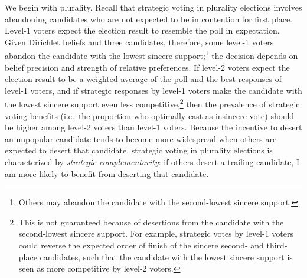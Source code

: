 \documentclass[11pt,a4paper]{article}
\begin{document}
We begin with plurality. Recall that  strategic voting in plurality elections involves abandoning candidates who are not expected to be in contention for first place. Level-1 voters expect the election result to resemble the poll in expectation. Given Dirichlet beliefs and three candidates, therefore, some level-1 voters abandon the candidate with the lowest sincere support;\footnote{Others may abandon the candidate with the second-lowest sincere support.} the decision depends on belief precision and strength of relative preferences. If level-2 voters expect the election result to be a weighted average of the poll and the best responses of level-1 voters, and if strategic responses by level-1 voters make the candidate with the lowest sincere support even less competitive,\footnote{This is not guaranteed because of desertions from the candidate with the second-lowest sincere support. For example, strategic votes by level-1 voters could reverse the expected order of finish of the sincere second- and third-place candidates, such that the candidate with the lowest sincere support is seen as more competitive by level-2 voters.} then the prevalence of strategic voting benefits (i.e.\ the proportion who optimally cast as insincere vote) should be higher among level-2 voters than level-1 voters. Because the incentive to desert an unpopular candidate tends to become more widespread when others are expected to desert that candidate, strategic voting in plurality elections is characterized by \emph{strategic complementarity}: if others desert a trailing candidate, I am more likely to benefit from deserting that candidate.
\end{document}
